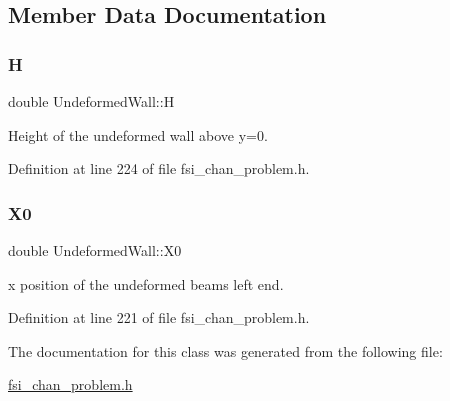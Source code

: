 \subsection{Member Data Documentation}
\mbox{\label{classUndeformedWall_a4525dbe0b5d2108ee51f16bee9af88ef}} 
\subsubsection{\texorpdfstring{H}{H}}
{\footnotesize\ttfamily double Undeformed\+Wall\+::H\hspace{0.3cm}{\ttfamily [private]}}



Height of the undeformed wall above y=0. 



Definition at line 224 of file fsi\+\_\+chan\+\_\+problem.\+h.

\mbox{\label{classUndeformedWall_a7ab875c46fef905df33eb47e0336581b}} 
\subsubsection{\texorpdfstring{X0}{X0}}
{\footnotesize\ttfamily double Undeformed\+Wall\+::\+X0\hspace{0.3cm}{\ttfamily [private]}}



x position of the undeformed beam\textquotesingle{}s left end. 



Definition at line 221 of file fsi\+\_\+chan\+\_\+problem.\+h.



The documentation for this class was generated from the following file\+:\begin{DoxyCompactItemize}
\item 
\hyperlink{fsi__chan__problem_8h}{fsi\+\_\+chan\+\_\+problem.\+h}\end{DoxyCompactItemize}
